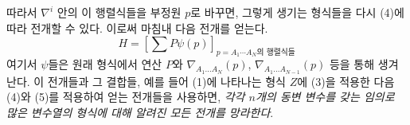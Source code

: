
따라서 $\nabla^i$ 안의 이 행렬식들을 부정원 $p$로 바꾸면, 그렇게 생기는 형식들을 다시 (4)에 따라 전개할 수 있다. 이로써 마침내 다음 전개를 얻는다.
\begin{equation}
  H=\left[\sum P\psi(p)\right]_{p=\text{$A_1\cdots A_N$의 행렬식들}}
\tag{5}
\end{equation}
여기서 $\psi$들은 원래 형식에서 연산 $P$와 $\nabla_{A_1\ldots A_N}(p)$, $\nabla_{A_1\ldots A_{N-1}}(p)$ 등을 통해 생겨난다. 이 전개들과 그 결합들, 예를 들어 (1)에 나타나는 형식 $Z$에 (3)을 적용한 다음 (4)와 (5)를 적용하여 얻는 전개들을 사용하면, \emph{각각 $n$개의 동변 변수를 갖는 임의로 많은 변수열의 형식에 대해 알려진 모든 전개를 망라한다}.
